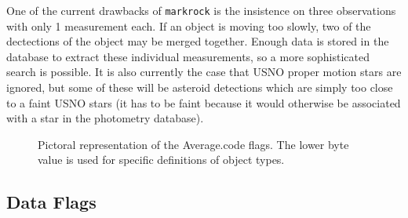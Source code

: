 \documentclass{article}
\begin{document}
One of the current drawbacks of {\tt markrock} is the insistence on
three observations with only 1 measurement each.  If an object is
moving too slowly, two of the dectections of the object may be merged
together.  Enough data is stored in the database to extract these
individual measurements, so a more sophisticated search is possible.
It is also currently the case that USNO proper motion stars are
ignored, but some of these will be asteroid detections which are
simply too close to a faint USNO stars (it has to be faint because it
would otherwise be associated with a star in the photometry
database).  

\begin{figure}
\caption{\label{flags} 
Pictoral representation of the Average.code flags.  The lower byte
value is used for specific definitions of object types.
}
\end{figure}

\subsection{Data Flags}
\end{document}
